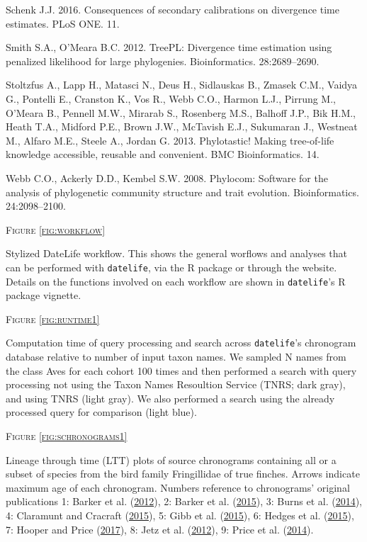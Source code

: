 \documentclass[]{article}
\begin{document}
\leavevmode\hypertarget{ref-Schenk2016}{}%
Schenk J.J. 2016. Consequences of secondary calibrations on divergence time estimates. PLoS ONE. 11.

\leavevmode\hypertarget{ref-Smith2012}{}%
Smith S.A., O'Meara B.C. 2012. TreePL: Divergence time estimation using penalized likelihood for large phylogenies. Bioinformatics. 28:2689--2690.

\leavevmode\hypertarget{ref-Stoltzfus2013}{}%
Stoltzfus A., Lapp H., Matasci N., Deus H., Sidlauskas B., Zmasek C.M., Vaidya G., Pontelli E., Cranston K., Vos R., Webb C.O., Harmon L.J., Pirrung M., O'Meara B., Pennell M.W., Mirarab S., Rosenberg M.S., Balhoff J.P., Bik H.M., Heath T.A., Midford P.E., Brown J.W., McTavish E.J., Sukumaran J., Westneat M., Alfaro M.E., Steele A., Jordan G. 2013. Phylotastic! Making tree-of-life knowledge accessible, reusable and convenient. BMC Bioinformatics. 14.

\leavevmode\hypertarget{ref-Webb2008}{}%
Webb C.O., Ackerly D.D., Kembel S.W. 2008. Phylocom: Software for the analysis of phylogenetic community structure and trait evolution. Bioinformatics. 24:2098--2100.

\newpage

\begin{center}
\textsc{Figure \ref{fig:workflow}}
\end{center}
Stylized DateLife workflow. This shows the general worflows and analyses that can be performed with \texttt{datelife}, via the R package or through the website. Details on the functions involved on each workflow are shown in \texttt{datelife}'s R package vignette.

\begin{center}
\textsc{Figure \ref{fig:runtime1}}
\end{center}
Computation time of query processing and search across \texttt{datelife}'s chronogram database relative to number of input taxon names. We sampled N names from the class Aves for each cohort 100 times and then performed a search with query processing not using the Taxon Names Resoultion Service (TNRS; dark gray), and using TNRS (light gray). We also performed a search using the already processed query for comparison (light blue). 

\begin{center}
\textsc{Figure \ref{fig:schronograms1}}
\end{center}
Lineage through time (LTT) plots of source chronograms containing all or a subset of species from the bird family Fringillidae of true finches. Arrows indicate maximum age of each chronogram. Numbers reference to chronograms' original publications 1: Barker et al. (\protect\hyperlink{ref-barker2012going}{2012}), 2: Barker et al. (\protect\hyperlink{ref-barker2015new}{2015}), 3: Burns et al. (\protect\hyperlink{ref-burns2014phylogenetics}{2014}), 4: Claramunt and Cracraft (\protect\hyperlink{ref-claramunt2015new}{2015}), 5: Gibb et al. (\protect\hyperlink{ref-gibb2015new}{2015}), 6: Hedges et al. (\protect\hyperlink{ref-Hedges2015}{2015}), 7: Hooper and Price (\protect\hyperlink{ref-hooper2017chromosomal}{2017}), 8: Jetz et al. (\protect\hyperlink{ref-Jetz2012}{2012}), 9: Price et al. (\protect\hyperlink{ref-price2014niche}{2014}).
\end{document}
